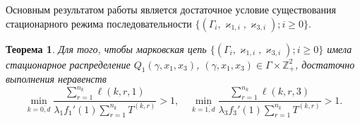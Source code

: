 \documentclass[12pt]{extarticle}
\theoremstyle{theorem}
\newtheorem{theorem}{Теорема}
\theoremstyle{remark}
\begin{document}
Основным результатом работы является достаточное условие существования стационарного режима последовательности $\{(\Gamma_i, \varkappa_{1,i},\varkappa_{3,i}); i \geqslant 0\}$.
\begin{theorem}
Для того, чтобы марковская цепь $\{(\Gamma_i, \varkappa_{1,i},\varkappa_{3,i}); i \geqslant 0\}$ имела стационарное распределение $Q_1(\gamma,x_1,x_3)$, $(\gamma,x_1,x_3)\in \Gamma \times {\mathbb Z}^2_+$, достаточно выполнения неравенств
\begin{equation}
\min_{k=\overline{0,d}} { \frac{\sum_{r = 1}^{n_k} \ell(k,r,1) }{\lambda_1 f_1'(1) \sum_{r=1}^{n_k} T^{(k,r)} }}>1, \quad 
\min_{k=\overline{1,d}} { \frac{\sum_{r = 1}^{n_k} \ell(k,r,3) }{\lambda_3 f_3'(1) \sum_{r=1}^{n_k} T^{(k,r)} }}>1.
\label{sufficient:double}
\end{equation}
\end{theorem}
\end{document}
